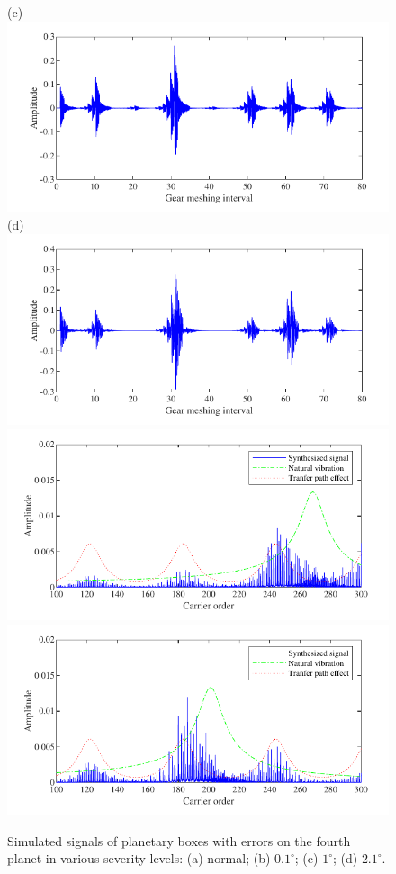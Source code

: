 \documentclass[a4paper,fleqn]{cas-sc}%
\begin{document}
\begin{figure}[pos=htbp]
    (c) \includegraphics[scale=\myscale,valign=t]{Time_p6_medium_error.pdf}
    (d) \includegraphics[scale=\myscale,valign=t]{Time_p6_severe_error.pdf}\\
    \hspace*{1.5em}\includegraphics[scale=\myscale,valign=t]{Freq_p6_medium_error.pdf}
    \hspace*{1.5em}\includegraphics[scale=\myscale,valign=t]{Freq_p6_severe_error.pdf}
    \caption{Simulated signals of planetary boxes with errors on the fourth planet in various severity levels: (a) normal; (b) $0.1^\circ$; (c) $1^\circ$; (d) $2.1^\circ$.}
    \label{fig:simulated_p6_severity}
\end{figure}
\end{document}
